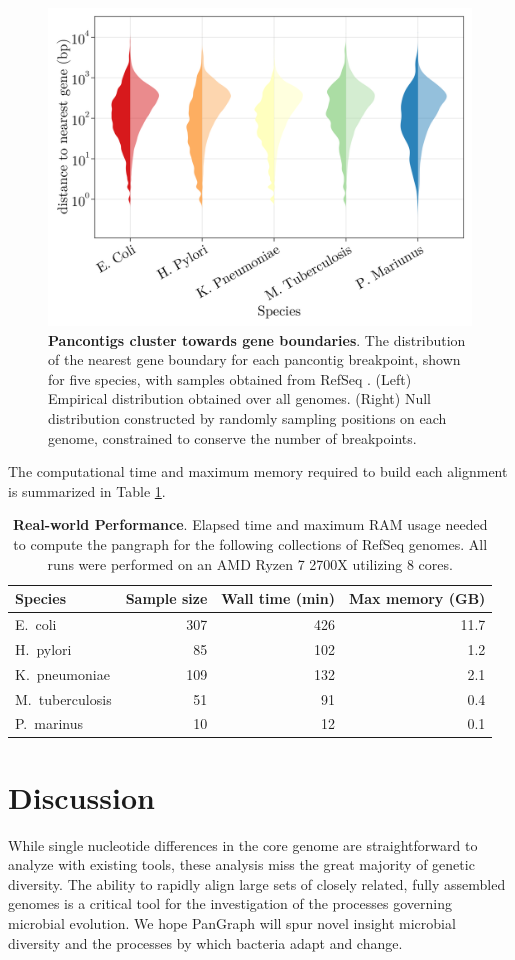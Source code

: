 \documentclass[aps,rmp,reprint,superscriptaddress,notitlepage,10pt]{revtex4-1}
\begin{document}
\begin{figure}[htb]
    \includegraphics[width=.5\textwidth]{panx-compare.png}
    \caption{{\bf Pancontigs cluster towards gene boundaries}.
    The distribution of the nearest gene boundary for each pancontig breakpoint, shown for five species, with samples obtained from RefSeq \cite{o2016reference}.
    (Left) Empirical distribution obtained over all genomes.
    (Right) Null distribution constructed by randomly sampling positions on each genome, constrained to conserve the number of breakpoints.
    }
    \label{fig:panx-accuracy}
\end{figure}

The computational time and maximum memory required to build each alignment is summarized in Table \ref{table:panx-performance}.

\begin{table}[hb]
    \caption{{\bf Real-world Performance}.
    Elapsed time and maximum RAM usage needed to compute the pangraph for the following collections of RefSeq genomes.
    All runs were performed on an AMD Ryzen 7 2700X utilizing 8 cores.
    }
    \begin{tabular}{l r r r }
    \hline\hline
    Species & Sample size & Wall time (min) & Max memory (GB) \\
    \hline
    E.~coli         & 307 & 426 & 11.7 \\
    H.~pylori       & 85 & 102 & 1.2 \\
    K.~pneumoniae   & 109 & 132 & 2.1 \\
    M.~tuberculosis & 51 & 91 & 0.4 \\
    P.~marinus      & 10 & 12 & 0.1 \\
    \hline
    \end{tabular}
    \label{table:panx-performance}
\end{table}

\section{Discussion}
While single nucleotide differences in the core genome are straightforward to analyze with existing tools, these analysis miss the great majority of genetic diversity. 
The ability to rapidly align large sets of closely related, fully assembled genomes is a critical tool for the investigation of the processes governing microbial evolution.
We hope PanGraph will spur novel insight microbial diversity and the processes by which bacteria adapt and change. 
\end{document}
